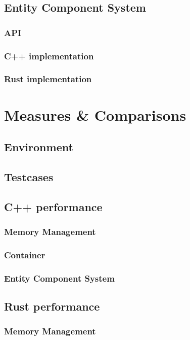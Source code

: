 \documentclass[MGS, Master, english]{twbook}
\begin{document}
\section{Entity Component System}
\blindtext
\subsection{API}
\blindtext
\subsection{C++ implementation}
\blindtext
\subsection{Rust implementation}
\blindtext
\chapter{Measures \& Comparisons}
\blindtext
\section{Environment}
\blindtext
\section{Testcases}
\blindtext
\section{C++ performance}
\blindtext
\subsection{Memory Management}
\blindtext
\subsection{Container}
\blindtext
\subsection{Entity Component System}
\blindtext
\section{Rust performance}
\blindtext
\subsection{Memory Management}
\blindtext
\end{document}
